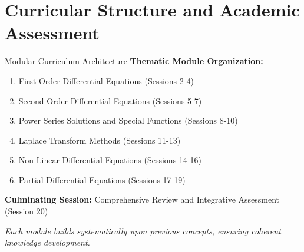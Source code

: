 \documentclass[10pt,aspectratio=169]{beamer}
\newcommand{\concept}[1]{\textcolor{mDarkTeal}{\textbf{#1}}}
\newcommand{\emphasis}[1]{\textit{#1}}
\begin{document}
\section{Curricular Structure and Academic Assessment}

\begin{frame}{Modular Curriculum Architecture}
    \concept{Thematic Module Organization:}
    
    \vspace{0.3cm}
    
    \begin{enumerate}
        \item First-Order Differential Equations (Sessions 2-4)
        \item Second-Order Differential Equations (Sessions 5-7)
        \item Power Series Solutions and Special Functions (Sessions 8-10)
        \item Laplace Transform Methods (Sessions 11-13)
        \item Non-Linear Differential Equations (Sessions 14-16)
        \item Partial Differential Equations (Sessions 17-19)
    \end{enumerate}
    
    \vspace{0.3cm}
    
    \concept{Culminating Session:} Comprehensive Review and Integrative Assessment (Session 20)
    
    \vspace{0.2cm}
    
    \emphasis{Each module builds systematically upon previous concepts, ensuring coherent knowledge development.}
\end{frame}
\end{document}
